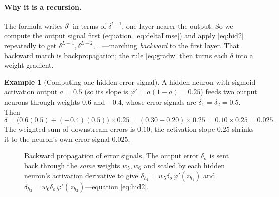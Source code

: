 \documentclass[11pt,a4paper]{report}
\theoremstyle{definition}
\newtheorem{example}{Example}[chapter]
\theoremstyle{remark}
\begin{document}
\paragraph{Why it is a recursion.} The formula writes $\delta^{l}$ in terms of
$\delta^{l+1}$, one layer nearer
the output. So we compute the output signal first
(equation~\eqref{eq:deltaLmse}) and apply \eqref{eq:hid2} repeatedly to get
$\delta^{L-1},\delta^{L-2},\dots$---marching \emph{backward} to the first layer.
That backward march is backpropagation; the rule \eqref{eq:gradw} then turns each
$\delta$ into a weight gradient.

\begin{example}[Computing one hidden error signal]
A hidden neuron with sigmoid activation output $a=0.5$ (so its slope is
$\varphi'=a(1-a)=0.25$) feeds two output neurons through weights $0.6$ and
$-0.4$, whose error signals are $\delta_{1}=\delta_{2}=0.5$. Then
\[
\delta=\bigl(0.6(0.5)+(-0.4)(0.5)\bigr)\times 0.25
      =(0.30-0.20)\times 0.25=0.10\times 0.25=0.025 .
\]
The weighted sum of downstream errors is $0.10$; the activation slope $0.25$
shrinks it to the neuron's own error signal $0.025$.
\end{example}

\begin{figure}[ht]
\centering
{}
\caption{Backward propagation of error signals. The output error $\delta_o$ is
sent back through the \emph{same} weights $w_5,w_6$ and scaled by each hidden
neuron's activation derivative to give
$\delta_{h_1}=w_5\delta_o\,\varphi'(z_{h_1})$ and
$\delta_{h_2}=w_6\delta_o\,\varphi'(z_{h_2})$---equation \eqref{eq:hid2}.}
\label{fig:backflow}
\end{figure}
\end{document}
